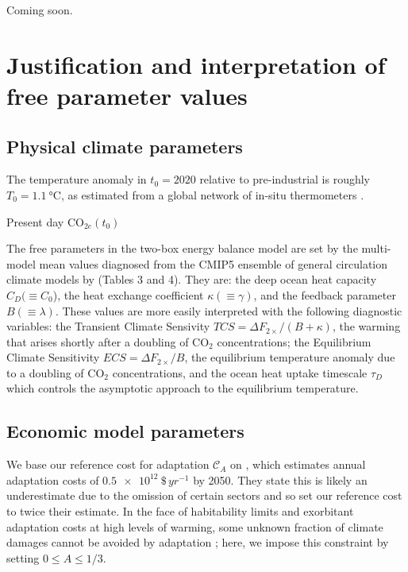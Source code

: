 \documentclass{article}
\begin{document}
Coming soon.


\appendix
\appendixpage
\addappheadtotoc


\section{Justification and interpretation of free parameter values}\label{sec.parameters}

\subsection{Physical climate parameters}
The temperature anomaly in $t_{0}=2020$ relative to pre-industrial is roughly $T_{0} = \SI{1.1}{\celsius}$, as estimated from a global network of in-situ thermometers \citep{lenssen_improvements_2019, nasagisstemp}.

Present day CO$_{2e}(t_{0})$

The free parameters in the two-box energy balance model are set by the multi-model mean values diagnosed from the CMIP5 ensemble of general circulation climate models by \cite{Geoffr} (Tables 3 and 4). They are: the deep ocean heat capacity $C_{D} (\equiv C_{0}$), the heat exchange coefficient $\kappa (\equiv \gamma)$, and the feedback parameter $B (\equiv \lambda)$. These values are more easily interpreted with the following diagnostic variables: the Transient Climate Sensivity $TCS = \Delta F_{2\times}/(B + \kappa)$, the warming that arises shortly after a doubling of CO$_{2}$ concentrations; the Equilibrium Climate Sensitivity $ECS = \Delta F_{2\times}/B$, the equilibrium temperature anomaly due to a doubling of CO$_{2}$ concentrations, and the ocean heat uptake timescale $\tau_{D}$ which controls the asymptotic approach to the equilibrium temperature.

\subsection{Economic model parameters}

We base our reference cost for adaptation  $\mathcal{C}_{A}$ on \cite{agr2018}, which estimates annual adaptation costs of $\SI{0.5e12}{\$\, yr^{-1}}$ by 2050. They state this is likely an underestimate due to the omission of certain sectors and so set our reference cost to twice their estimate. In the face of habitability limits \citep[e.g.][]{sherwood_adaptability_2010} and exorbitant adaptation costs at high levels of warming, some unknown fraction of climate damages cannot be avoided by adaptation \citep{chambwera2014economics}; here, we impose this constraint by setting $0 \le A \le 1/3$.
\end{document}
